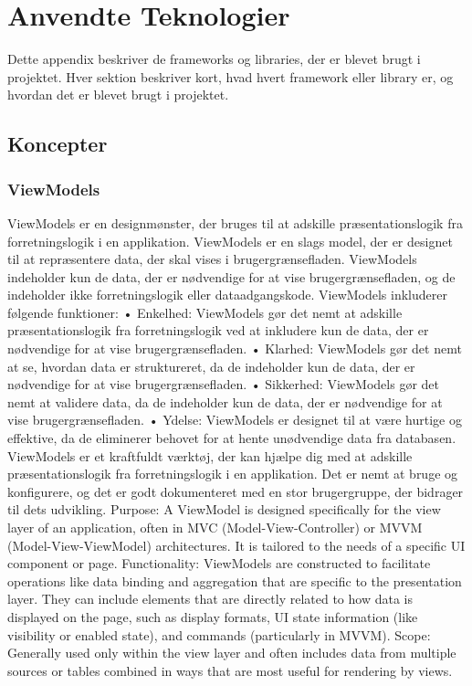 \chapter{Anvendte Teknologier}
Dette appendix beskriver de frameworks og libraries, der er blevet brugt i projektet. Hver sektion beskriver kort, hvad hvert framework eller library er, og hvordan det er blevet brugt i projektet.

\section{Koncepter}

\subsection{ViewModels}
ViewModels er en designmønster, der bruges til at adskille præsentationslogik fra forretningslogik i en applikation. ViewModels er en slags model, der er designet til at repræsentere data, der skal vises i brugergrænsefladen. ViewModels indeholder kun de data, der er nødvendige for at vise brugergrænsefladen, og de indeholder ikke forretningslogik eller dataadgangskode.
ViewModels inkluderer følgende funktioner:
•	Enkelhed: ViewModels gør det nemt at adskille præsentationslogik fra forretningslogik ved at inkludere kun de data, der er nødvendige for at vise brugergrænsefladen.
•	Klarhed: ViewModels gør det nemt at se, hvordan data er struktureret, da de indeholder kun de data, der er nødvendige for at vise brugergrænsefladen.
•	Sikkerhed: ViewModels gør det nemt at validere data, da de indeholder kun de data, der er nødvendige for at vise brugergrænsefladen.
•	Ydelse: ViewModels er designet til at være hurtige og effektive, da de eliminerer behovet for at hente unødvendige data fra databasen.
ViewModels er et kraftfuldt værktøj, der kan hjælpe dig med at adskille præsentationslogik fra forretningslogik i en applikation. Det er nemt at bruge og konfigurere, og det er godt dokumenteret med en stor brugergruppe, der bidrager til dets udvikling.
Purpose: A ViewModel is designed specifically for the view layer of an application, often in MVC (Model-View-Controller) or MVVM (Model-View-ViewModel) architectures. It is tailored to the needs of a specific UI component or page.
Functionality: ViewModels are constructed to facilitate operations like data binding and aggregation that are specific to the presentation layer. They can include elements that are directly related to how data is displayed on the page, such as display formats, UI state information (like visibility or enabled state), and commands (particularly in MVVM).
Scope: Generally used only within the view layer and often includes data from multiple sources or tables combined in ways that are most useful for rendering by views.

